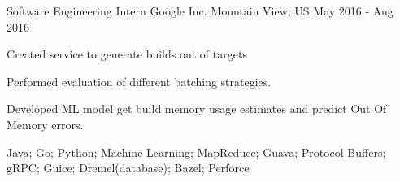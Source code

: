 

\begin{cventries}


  \cventry
    {Software Engineering Intern} %
    {Google Inc.} %
    {Mountain View, US} %
    {May 2016 - Aug 2016} %
    {
      \begin{cvitems} %
        \item {Created service to generate builds out of targets}
        \item {Performed evaluation of different batching strategies.}
        \item {Developed ML model get build memory usage estimates and predict Out Of Memory errors.}
        \item {Java; Go; Python; Machine Learning; MapReduce; Guava; Protocol Buffers; gRPC; Guice; Dremel(database); Bazel; Perforce}
      \end{cvitems}
    }

\end{cventries}
